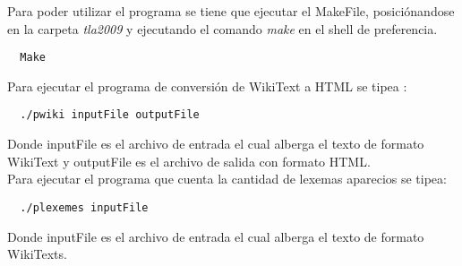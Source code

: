 \documentclass[a4paper,11pt]{article}
\begin{document}
Para poder utilizar el programa se tiene que ejecutar el MakeFile, posici\'onandose en la carpeta \emph{tla2009} y ejecutando el comando \emph{make} en el shell de preferencia.\\
\begin{center}
 \begin{verbatim}
  Make
 \end{verbatim}
\end{center}

Para ejecutar el programa de conversi\'on de WikiText a HTML se tipea : \\

\begin{center}
 \begin{verbatim}
  ./pwiki inputFile outputFile 
 \end{verbatim}
\end{center}

Donde inputFile es el archivo de entrada el cual alberga el texto de formato WikiText y outputFile es el archivo de salida con formato HTML.\\

Para ejecutar el programa que cuenta la cantidad de lexemas aparecios se tipea: \\
\begin{center}
 \begin{verbatim}
  ./plexemes inputFile
 \end{verbatim}
\end{center}

Donde inputFile es el archivo de entrada el cual alberga el texto de formato WikiTexts.\\
\end{document}
